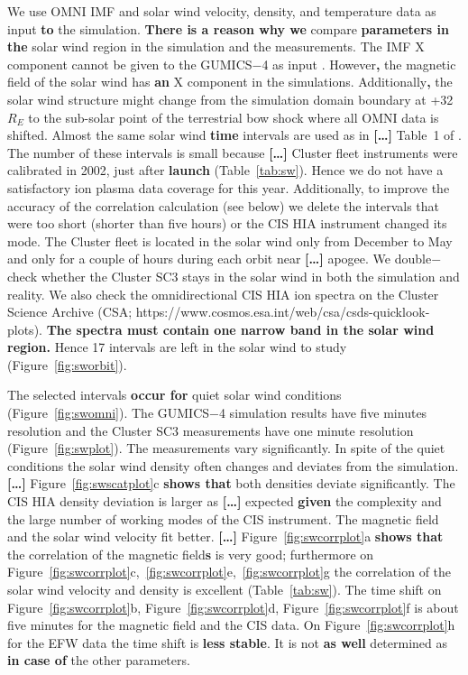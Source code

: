 \documentclass[linenumbers,draft]{agujournal}
\begin{document}
We use OMNI IMF and solar wind velocity, density, and temperature data as input \textbf{to} the simulation. \textbf{There is a reason why we} compare \textbf{parameters in the} solar wind region in the simulation and the measurements. The IMF X component cannot be given to the GUMICS$-$4 as input \citep{janhunen12:_gumic_mhd,facsko16:_one_earth}. However\textbf{,} the magnetic field of the solar wind has \textbf{an} X component in the simulations. Additionally\textbf{,} the solar wind structure might change from the simulation domain boundary at +32\,$R_E$ to the sub-solar point of the terrestrial bow shock where all OMNI data is shifted. Almost the same solar wind \textbf{time} intervals are used as in \textbf{[\dots]} Table~1 of \citet{facsko16:_one_earth}. The number of these intervals is small because \textbf{[\dots]} Cluster fleet instruments were calibrated in 2002, just after \textbf{launch} (Table~\ref{tab:sw}). Hence we do not have a satisfactory ion plasma data coverage for this year. Additionally, to improve the accuracy of the correlation calculation (see below) we delete the intervals that were too short (shorter than five hours) or the CIS HIA instrument changed its mode. The Cluster fleet is located in the solar wind only from December to May and only for a couple of hours during each orbit near \textbf{[\dots]} apogee. We double$-$check whether the Cluster SC3 stays in the solar wind in both the simulation and reality. We also check the omnidirectional CIS HIA ion spectra on the Cluster Science Archive (CSA; https://www.cosmos.esa.int/web/csa/csds-quicklook-plots). \textbf{The spectra must contain one narrow band in the solar wind region.} Hence 17 intervals are left in the solar wind to study (Figure~\ref{fig:sworbit}). 

The selected intervals \textbf{occur for} quiet solar wind conditions (Figure~\ref{fig:swomni}). The GUMICS$-$4 simulation results have five minutes resolution and the Cluster SC3 measurements have one minute resolution (Figure~\ref{fig:swplot}). The measurements vary significantly. In spite of the quiet conditions the solar wind density often changes and deviates from the simulation. \textbf{[\dots]} Figure~\ref{fig:swscatplot}c \textbf{shows that} both densities deviate significantly. The CIS HIA density deviation is larger as \textbf{[\dots]} expected \textbf{given} the complexity and the large number of working modes of the CIS instrument. The magnetic field and the solar wind velocity fit better. \textbf{[\dots]} Figure~\ref{fig:swcorrplot}a \textbf{shows that} the correlation of the magnetic field\textbf{s} is very good; furthermore on Figure~\ref{fig:swcorrplot}c,~\ref{fig:swcorrplot}e,~\ref{fig:swcorrplot}g the correlation of the solar wind velocity and density is excellent (Table~\ref{tab:sw}). The time shift on Figure~\ref{fig:swcorrplot}b, Figure~\ref{fig:swcorrplot}d, Figure~\ref{fig:swcorrplot}f is about five minutes for the magnetic field and the CIS data. On Figure~\ref{fig:swcorrplot}h for the EFW data the time shift is \textbf{less stable}. It is not \textbf{as well} determined as \textbf{in case of} the other parameters.
\end{document}
